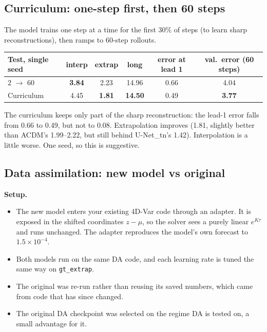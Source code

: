 \subsection{Curriculum: one-step first, then 60 steps}\label{sec:curr}

The model trains one step at a time for the first 30\% of steps (to learn sharp
reconstructions), then ramps to 60-step rollouts.

\begin{center}\small
\begin{tabular}{lccccc}
\toprule
Test, single seed & interp & extrap & long & error at lead 1 & val.\ error (60 steps)\\
\midrule
2 $\to$ 60 & \textbf{3.84} & 2.23 & 14.96 & 0.66 & 4.04\\
Curriculum & 4.45 & \textbf{1.81} & \textbf{14.50} & 0.49 & \textbf{3.77}\\
\bottomrule
\end{tabular}
\end{center}

\noindent The curriculum keeps only part of the sharp reconstruction: the lead-1 error falls
from 0.66 to 0.49, but not to 0.08. Extrapolation improves (1.81, slightly better than ACDM's
1.99--2.22, but still behind U-Net\_tn's 1.42). Interpolation is a little worse. One seed, so
this is suggestive.

\subsection{Data assimilation: new model vs original}\label{sec:da}

\textbf{Setup.}
\begin{itemize}
\item The new model enters your existing 4D-Var code through an adapter. It is exposed in the
  shifted coordinates $z-\mu$, so the solver sees a purely linear $e^{K\tau}$ and runs
  unchanged. The adapter reproduces the model's own forecast to $1.5\times10^{-4}$.
\item Both models run on the same DA code, and each learning rate is tuned the same way on
  \texttt{gt\_extrap}.
\item The original was re-run rather than reusing its saved numbers, which came from code
  that has since changed.
\item The original DA checkpoint was selected on the regime DA is tested on, a small
  advantage for it.
\end{itemize}

